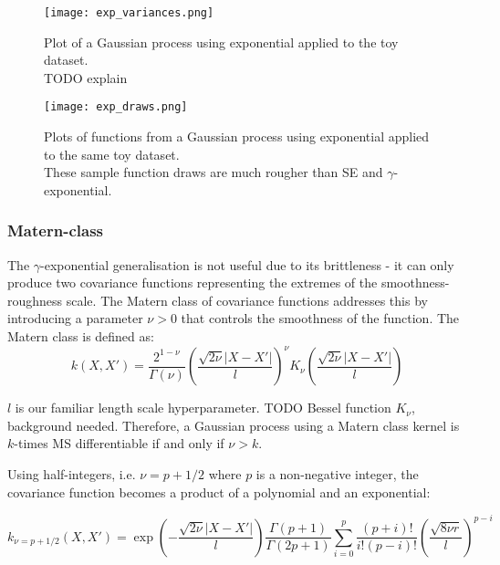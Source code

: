\begin{figure}[H]
    \texttt{[image: exp\_variances.png]}
    \caption{
        Plot of a Gaussian process using exponential applied to the toy dataset. \\
        TODO explain
    }
\end{figure}

\begin{figure}[H]
    \texttt{[image: exp\_draws.png]}
    \caption{
        Plots of functions from a Gaussian process using exponential applied to the same toy dataset. \\
        These sample function draws are much rougher than SE and $\gamma$-exponential.
    }
\end{figure}




\subsubsection{Matern-class}
The $\gamma$-exponential generalisation is not useful due to its brittleness - it can only produce two covariance functions representing the extremes of the smoothness-roughness scale. The Matern class of covariance functions addresses this by introducing a parameter $\nu > 0$ that controls the smoothness of the function. The Matern class is defined as:
\begin{equation*}
    k(X,X') = \frac{2^{1 - \nu}}{\Gamma(\nu)}\left(\frac{\sqrt{2\nu}|X - X'|}{l}\right)^{\nu}K_{\nu}\left(\frac{\sqrt{2\nu}|X - X'|}{l}\right)
\end{equation*}

$l$ is our familiar length scale hyperparameter. TODO Bessel function $K_{\nu}$, background needed. Therefore, a Gaussian process using a Matern class kernel is $k$-times MS differentiable if and only if $\nu > k$. 

Using half-integers, i.e. $\nu = p + 1/2$ where $p$ is a non-negative integer, the covariance function becomes a product of a polynomial and an exponential:

\begin{equation*}
    k_{\nu = p + 1/2}(X,X') = \exp \left(- \frac{\sqrt{2\nu}|X - X'|}{l} \right) \frac{\Gamma(p+1)}{\Gamma(2p+1)} \sum_{i=0}^p \frac{(p + i)!}{i!(p-i)!} \left( \frac{\sqrt{8\nu r}}{l} \right)^{p-i}
\end{equation*}

